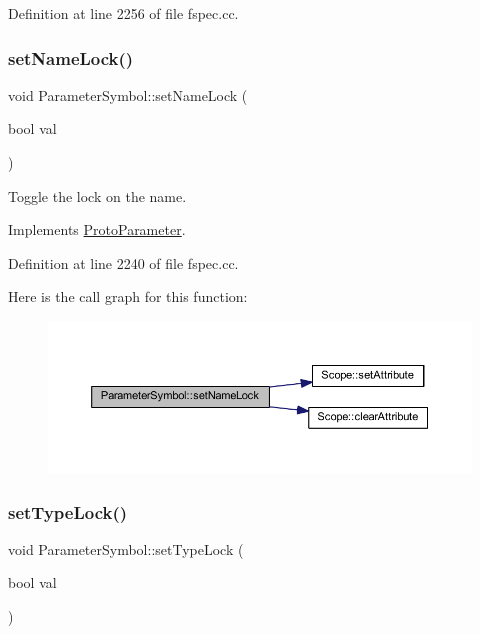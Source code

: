 Definition at line 2256 of file fspec.\+cc.

\mbox{\label{class_parameter_symbol_a1a69d14c3fd3a083f36a0c47b633ea28}} 
\subsubsection{\texorpdfstring{setNameLock()}{setNameLock()}}
{\footnotesize\ttfamily void Parameter\+Symbol\+::set\+Name\+Lock (\begin{DoxyParamCaption}\item[{bool}]{val }\end{DoxyParamCaption})\hspace{0.3cm}{\ttfamily [virtual]}}



Toggle the lock on the name. 



Implements \mbox{\hyperlink{class_proto_parameter_ac444ad9eb331af2d5a72d1f1ef1250ae}{Proto\+Parameter}}.



Definition at line 2240 of file fspec.\+cc.

Here is the call graph for this function\+:
\nopagebreak
\begin{figure}[H]
\begin{center}
\leavevmode
\includegraphics[width=350pt]{class_parameter_symbol_a1a69d14c3fd3a083f36a0c47b633ea28_cgraph}
\end{center}
\end{figure}
\mbox{\label{class_parameter_symbol_a87a4c3430377ccdd1efa5c3c4d720e9c}} 
\subsubsection{\texorpdfstring{setTypeLock()}{setTypeLock()}}
{\footnotesize\ttfamily void Parameter\+Symbol\+::set\+Type\+Lock (\begin{DoxyParamCaption}\item[{bool}]{val }\end{DoxyParamCaption})\hspace{0.3cm}{\ttfamily [virtual]}}



